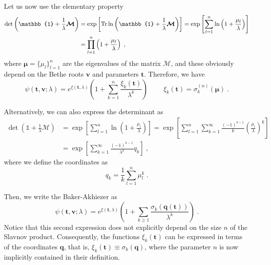 \documentclass[a4paper,11pt]{amsart}
\begin{document}
Let us now use the elementary property
\begin{subequations}
\begin{equation}
  \begin{split}
    \det \left( \mathbb{1} + \frac{1}{\lambda} \bm{\mathcal{M}}\right)
    & = \exp \left[ \Tr \ln \left( \mathbb{1} + \frac{1}{\lambda} \bm{\mathcal{M}} \right) \right]
    = \exp\left[ \sum_{l=1}^n \ln \left( 1 + \frac{\mu_l}{\lambda} \right)\right]\\
    & = \prod_{l=1}^n \left( 1 + \frac{\mu_l}{\lambda} \right) \; ,
  \end{split}
\end{equation}
\end{subequations}
where \(\bm{\mu} = \{\mu_l\}_{l=1}^n\) are the eigenvalues of the
matrix \(\bm{\mathcal{M}}\), and these obviously depend on the Bethe
roots \(\bm{v}\) and parameters \(\bm{t}\).  Therefore, we have
\begin{equation}
  \label{eq:ba-standard}
  \psi(\bm{t},\bm{v}; \lambda) = e^{\xi(\bm{t}, \lambda)}
  \left(1 + \sum_{k=1}^n \frac{\xi_k(\bm{t})}{\lambda^k} 
  \right)\; \qquad \xi_k(\bm{t}) = \sigma_k^{(n)}(\bm{\mu})\; .
\end{equation}

Alternatively, we can also express the determinant as
\begin{equation}
  \begin{split}
    \det \left( \mathbb{1} + \frac{1}{\lambda} \bm{\mathcal{M}}\right)
    & = \exp\left[ \sum_{l=1}^n \ln \left( 1 + \frac{\mu_l}{\lambda} \right)\right]
    = \exp\left[ \sum_{l=1}^n \sum_{k=1}^\infty \frac{(-1)^{k-1}}{k} \left(\frac{\mu_l}{\lambda} \right)^k\right] \\ 
    & = \exp\left[ \sum_{k=1}^\infty \frac{(-1)^{k-1}}{\lambda^k} q_k\right] \; ,
  \end{split}
\end{equation}
where we define the coordinates as 
\begin{equation}
q_k = \frac{1}{k} \sum_{l=1}^n \mu_l^k\; .
\end{equation}

Then, we write the Baker-Akhiezer as 
\begin{equation}
\label{eq:ba-nindependent}
  \psi(\bm{t},\bm{v}; \lambda) = e^{\xi(\bm{t}, \lambda)}
  \left(1 + \sum_{k\geq 1} \frac{\sigma_k(\bm{q}(\bm{t}))}{\lambda^k} 
  \right)\; .
\end{equation}
Notice that this second expression does not explicitly depend on the
size \( n \) of the Slavnov product. Consequently, the functions \(
\xi_k(\bm{t}) \) can be expressed in terms of the coordinates \(
\bm{q} \), that is, \( \xi_k(\bm{t}) \equiv \sigma_k(\bm{q}) \), where
the parameter \( n \) is now implicitly contained in their definition.
\end{document}
